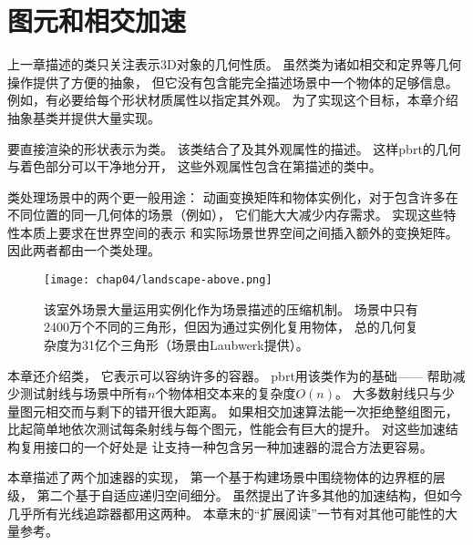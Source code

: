 \chapter{图元和相交加速}\label{chap:图元和相交加速}
\setcounter{sidenote}{1}

上一章描述的类只关注表示3D对象的几何性质。
虽然类为诸如相交和定界等几何操作提供了方便的抽象，
但它没有包含能完全描述场景中一个物体的足够信息。
例如，有必要给每个形状材质属性以指定其外观。
为了实现这个目标，本章介绍抽象基类并提供大量实现。

要直接渲染的形状表示为类。
该类结合了及其外观属性的描述。
这样pbrt的几何与着色部分可以干净地分开，
这些外观属性包含在第描述的类中。

类处理场景中的两个更一般用途：
动画变换矩阵和物体实例化，对于包含许多在不同位置的同一几何体的场景（例如），
它们能大大减少内存需求。
实现这些特性本质上要求在世界空间的表示
和实际场景世界空间之间插入额外的变换矩阵。
因此两者都由一个类处理。
\begin{figure}[htbp]
    \centering\texttt{[image: chap04/landscape-above.png]}
    \caption{该室外场景大量运用实例化作为场景描述的压缩机制。
        场景中只有2400万个不同的三角形，但因为通过实例化复用物体，
        总的几何复杂度为31亿个三角形（场景由Laubwerk提供）。}
    \label{fig:4.1}
\end{figure}

本章还介绍类，
它表示可以容纳许多的容器。
pbrt用该类作为的基础——
帮助减少测试射线与场景中所有$n$个物体相交本来的复杂度$O(n)$。
大多数射线只与少量图元相交而与剩下的错开很大距离。
如果相交加速算法能一次拒绝整组图元，
比起简单地依次测试每条射线与每个图元，性能会有巨大的提升。
对这些加速结构复用接口的一个好处是
让支持一种包含另一种加速器的混合方法更容易。

本章描述了两个加速器的实现，
第一个基于构建场景中围绕物体的边界框的层级，
第二个基于自适应递归空间细分。
虽然提出了许多其他的加速结构，但如今几乎所有光线追踪器都用这两种。
本章末的“扩展阅读”一节有对其他可能性的大量参考。












